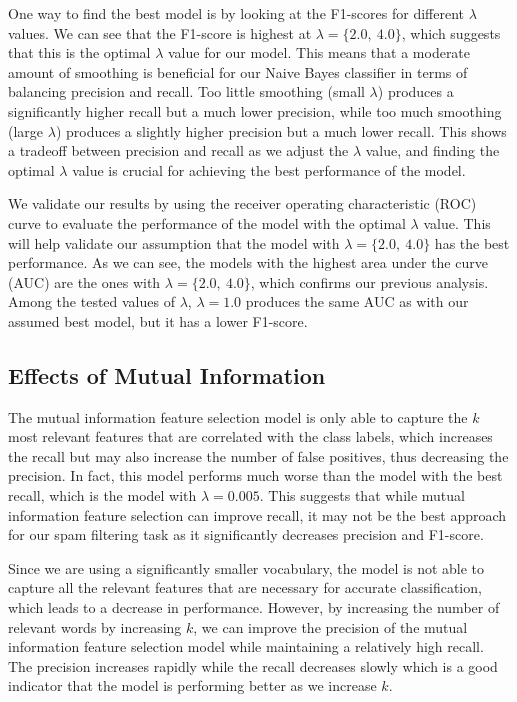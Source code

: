 \documentclass{acm_proc_article-sp}
\begin{document}
One way to find the best model is by looking at the F1-scores for different $\lambda$ values. We can see that the F1-score is highest at $\lambda = \{2.0,\ 4.0\}$, which suggests that this is the optimal $\lambda$ value for our model. This means that a moderate amount of smoothing is beneficial for our Naive Bayes classifier in terms of balancing precision and recall. Too little smoothing (small $\lambda$) produces a significantly higher recall but a much lower precision, while too much smoothing (large $\lambda$) produces a slightly higher precision but a much lower recall. This shows a tradeoff between precision and recall as we adjust the $\lambda$ value, and finding the optimal $\lambda$ value is crucial for achieving the best performance of the model.

We validate our results by using the receiver operating characteristic (ROC) curve to evaluate the performance of the model with the optimal $\lambda$ value. This will help validate our assumption that the model with $\lambda = \{2.0,\ 4.0\}$ has the best performance. As we can see, the models with the highest area under the curve (AUC) are the ones with $\lambda = \{2.0,\ 4.0\}$, which confirms our previous analysis. Among the tested values of $\lambda$, $\lambda = 1.0$ produces the same AUC as with our assumed best model, but it has a lower F1-score.

\subsection{Effects of Mutual Information}

The mutual information feature selection model is only able to capture the $k$ most relevant features that are correlated with the class labels, which increases the recall but may also increase the number of false positives, thus decreasing the precision. In fact, this model performs much worse than the model with the best recall, which is the model with $\lambda = 0.005$. This suggests that while mutual information feature selection can improve recall, it may not be the best approach for our spam filtering task as it significantly decreases precision and F1-score. 

Since we are using a significantly smaller vocabulary, the model is not able to capture all the relevant features that are necessary for accurate classification, which leads to a decrease in performance. However, by increasing the number of relevant words by increasing $k$, we can improve the precision of the mutual information feature selection model while maintaining a relatively high recall. The precision increases rapidly while the recall decreases slowly which is a good indicator that the model is performing better as we increase $k$.
\end{document}
